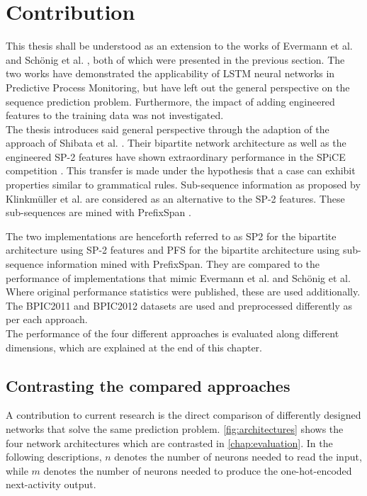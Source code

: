\chapter{Contribution}\label{sec:contribution}

This thesis shall be understood as an extension to the works of Evermann et al. \cite{evermann2016} and Schönig et al. \cite{schoenig2018}, both of which were presented in the previous section. The two works have demonstrated the applicability of LSTM neural networks in Predictive Process Monitoring, but have left out the general perspective on the sequence prediction problem. Furthermore, the impact of adding engineered features to the training data was not investigated.\\

The thesis introduces said general perspective through the adaption of the approach of Shibata et al. \cite{shibata2016bipartite}. Their bipartite network architecture as well as the engineered SP-2 features have shown extraordinary performance in the SPiCE competition \cite{web:spice}. This transfer is made under the hypothesis that a case can exhibit properties similar to grammatical rules. Sub-sequence information as proposed by Klinkmüller et al. \cite{klinkmuller2018reliablemonitoring} are considered as an alternative to the SP-2 features. These sub-sequences are mined with PrefixSpan \cite{pei2001prefixspan}.

The two implementations are henceforth referred to as SP2 for the bipartite architecture using SP-2 features and PFS for the bipartite architecture using sub-sequence information mined with PrefixSpan. They are compared to the performance of implementations that mimic Evermann et al. and Schönig et al. Where original performance statistics were published, these are used additionally. The BPIC2011 \cite{BPIC2011} and BPIC2012 \cite{BPIC2012} datasets are used and preprocessed differently as per each approach.\\

The performance of the four different approaches is evaluated along different dimensions, which are explained at the end of this chapter.

\section{Contrasting the compared approaches}
A contribution to current research is the direct comparison of differently designed networks that solve the same prediction problem. \autoref{fig:architectures} shows the four network architectures which are contrasted in \autoref{chap:evaluation}. In the following descriptions, $n$ denotes the number of neurons needed to read the input, while $m$ denotes the number of neurons needed to produce the one-hot-encoded next-activity output.\\

